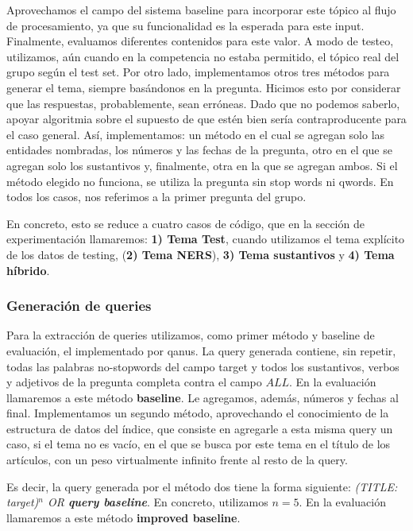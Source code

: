 Aprovechamos el campo  del sistema baseline para incorporar este tópico al flujo de procesamiento, ya que su funcionalidad es la esperada para este input.
Finalmente, evaluamos diferentes contenidos para este valor. A modo de testeo, utilizamos, aún cuando en la competencia no estaba permitido, el tópico real del grupo según el test set. Por otro lado, implementamos otros tres métodos para generar el tema, siempre basándonos en la pregunta. Hicimos esto por considerar que las respuestas, probablemente, sean erróneas. Dado que no podemos saberlo, apoyar algoritmia sobre el supuesto de que estén bien sería contraproducente para el caso general. Así, implementamos: un método en el cual se agregan solo las entidades nombradas, los números y las fechas de la pregunta, otro en el que se agregan solo los sustantivos y, finalmente, otra en la que se agregan ambos. Si el método elegido no funciona, se utiliza la pregunta sin stop words ni qwords. En todos los casos, nos referimos a la primer pregunta del grupo.

En concreto, esto se reduce a cuatro casos de código, que en la sección de experimentación llamaremos: \textbf{1) Tema Test}, cuando utilizamos el tema explícito de los datos de testing, (\textbf{2) Tema NERS}), \textbf{3) Tema sustantivos} y \textbf{4) Tema híbrido}.

\subsubsection{Generación de queries}

Para la extracción de queries utilizamos, como primer método y baseline de evaluación, el implementado por qanus. La query generada contiene, sin repetir, todas las palabras no-stopwords del campo target y todos los sustantivos, verbos y adjetivos de la pregunta completa contra el campo $ALL$. En la evaluación llamaremos a este método \textbf{baseline}. Le agregamos, además, números y fechas al final. Implementamos un segundo método, aprovechando el conocimiento de la estructura de datos del índice, que consiste en agregarle a esta misma query un caso, si el tema no es vacío, en el que se busca por este tema en el título de los artículos, con un peso virtualmente infinito frente al resto de la query.

Es decir, la query generada por el método dos tiene la forma siguiente: \textit{(TITLE: target)$^n$ OR \textbf{query baseline}}. En concreto, utilizamos $n=5$. En la evaluación llamaremos a este método \textbf{improved baseline}.

